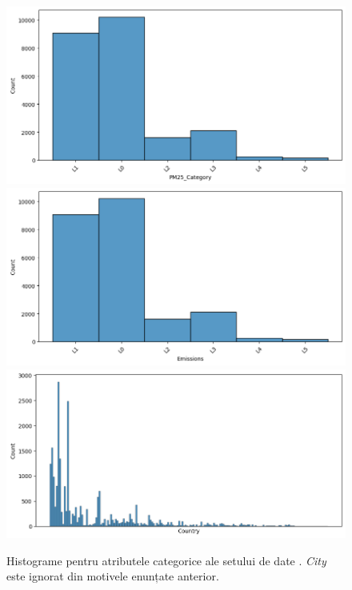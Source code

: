 \documentclass{article}
\begin{document}
\begin{figure}[htb]
    \includegraphics[scale=0.33]{air_pollution/analysis/categorical/pm25.png}
    \includegraphics[scale=0.33]{air_pollution/analysis/categorical/emissions.png}
    \includegraphics[scale=0.33]{air_pollution/analysis/categorical/country.png}
    \caption{Histograme pentru atributele categorice ale setului de date . 
    \textit{City} este ignorat din motivele enunțate anterior.}
    \label{fig:pol:cat_hists}
\end{figure}
\end{document}
